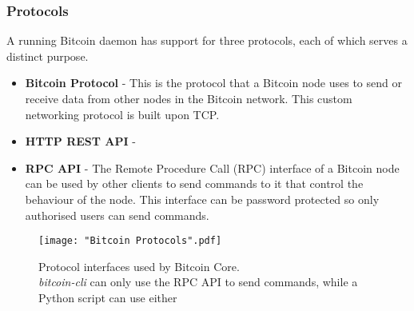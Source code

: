 \subsubsection{Protocols} \label{btc-interfaces}

A running Bitcoin daemon has support for three protocols, each of which serves a distinct purpose.

\begin{itemize}
    \item \textbf{Bitcoin Protocol} - This is the protocol that a Bitcoin node uses to send or receive data from other nodes in the Bitcoin network. This custom networking protocol is built upon TCP.

    \item \textbf{HTTP REST API} - 

    \item \textbf{RPC API} - The Remote Procedure Call (RPC) interface of a Bitcoin node can be used by other clients to send commands to it that control the behaviour of the node.
    This interface can be password protected so only authorised users can send commands.
\end{itemize}

\begin{figure}[!htb]
    \centering
    \texttt{[image: "Bitcoin Protocols".pdf]}
    \caption[Protocol interfaces used by Bitcoin Core.]
    {
        Protocol interfaces used by Bitcoin Core. \\
        \footnotesize
        \textit{bitcoin-cli} can only use the RPC API to send commands, while a Python script can use either 
    }
    \label{fig-btc-arch}
\end{figure}
